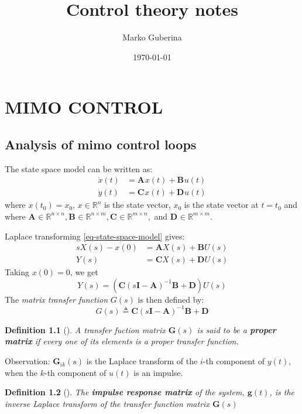\documentclass{book}
\title{Control theory notes}
\date{\today}
\author{Marko Guberina}
\newtheorem{definition}{Definition}
\begin{document}
\maketitle
\newpage
{}

\chapter{MIMO CONTROL}%
\label{cha:mimo_control}

\section{Analysis of mimo control loops}
The state space model can be written as:
\begin{align}
		\label{eq-state-space-model}
		\dot{x} (t) &= \bm{A}_{} x (t) + \bm{B}_{} u (t) \\
		\dot{y} (t) &= \bm{C}_{} x (t) + \bm{D}_{} u (t) 
\end{align}
where $ x (t_{ 0 }) = x_{ 0 }  $, $ x \in \mathbb{R}^{ n }  $ is the state vector,
$ x_{ 0 }  $ is the state vector at $ t=t_{ 0 }  $
and where $ \bm{A}_{} \in \mathbb{R}^{ n \times n } , \bm{B}_{} \in \mathbb{R}^{ n \times m }, 
\bm{C}_{} \in \mathbb{R}^{ m \times n }, $ and $ \bm{D}_{} \in \mathbb{R}^{ m \times m }  $.

Laplace transforming \ref{eq-state-space-model} gives:
\begin{align}
		s X(s) - x(0) &= \bm{A} X(s) + \bm{B} U (s)\\
		Y (s) &= \bm{C} X (s) + \bm{D} U (s)
\end{align}
Taking $ x (0) = 0  $, we get
\begin{equation}
Y (s) = (\bm{C} (s\bm{I}  - \bm{A}) ^{ -1 }\bm{B} +\bm{D} ) U (s)
\end{equation}
The \textit{matrix transfer function} $ G (s)  $ is then defined by:
\begin{equation}
G (s) \triangleq \bm{C}  (s \bm{I} - \bm{A} )^{ -1 }\bm{B}  + \bm{D} 
\end{equation}

\begin{definition}[]
		A transfer fuction matrix $ \bm{G} (s)  $ is said to be a 
		\textbf{proper matrix} if every one of its elements is a proper transfer function.
\end{definition}
Observation: $ \bm{G}_{ik} (s)  $ is the Laplace transform of the
$ i  $-th component of $ y (t)  $, when the $ k  $-th component of
$ u (t)  $ is an impulse.
\begin{definition}[]
		The \textbf{impulse response matrix} of the system, $ \bm{g} (t)  $, is 
		the inverse Laplace transform of the transfer function matrix $ \bm{G} (s)  $
\end{definition}
\end{document}
